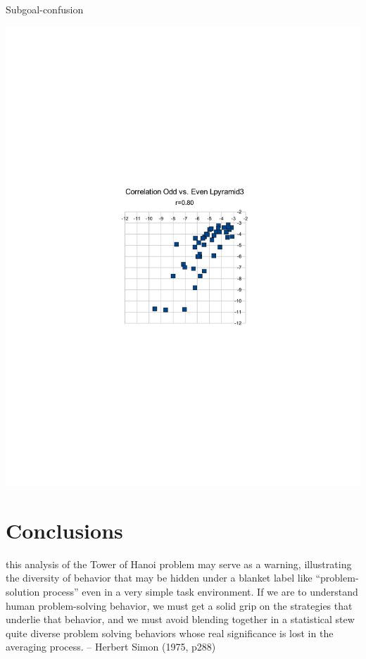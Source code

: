 \documentclass[xcolor=table]{beamer}
\begin{document}
\begin{frame}{Subgoal-confusion}
\centerline{
 \includegraphics[trim= 10cm 10cm 10cm 10cm,height=.8\textheight]{lpyramid3.pdf}}
\end{frame}


\section{Conclusions}
\label{sec:conclusions}

\begin{frame}
  this analysis of the Tower of Hanoi problem may serve as a warning,
  illustrating the diversity of behavior that may be hidden under a
  blanket label like ``problem-solution process'' even in a very
  simple task environment. If we are to understand human
  problem-solving behavior, we must get a solid grip on the strategies
  that underlie that behavior, and we must avoid blending together in
  a statistical stew quite diverse problem solving behaviors whose
  real significance is lost in the averaging process. -- Herbert Simon
  (1975, p288)
\end{frame}
\end{document}
